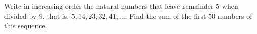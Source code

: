 Write in increasing order the natural numbers that leave remainder $5$ when divided by $9$, that is, $5, 14, 23, 32, 41, \ldots$. Find the sum of the first $50$ numbers of this sequence.
